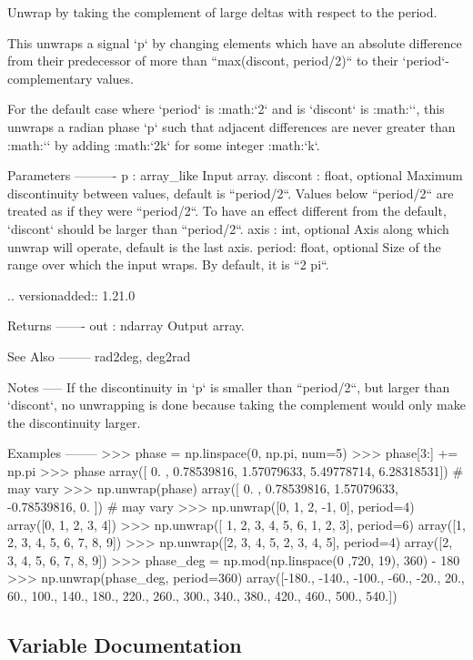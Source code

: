 \begin{DoxyVerb}Unwrap by taking the complement of large deltas with respect to the period.

This unwraps a signal `p` by changing elements which have an absolute
difference from their predecessor of more than ``max(discont, period/2)``
to their `period`-complementary values.

For the default case where `period` is :math:`2\pi` and is `discont` is
:math:`\pi`, this unwraps a radian phase `p` such that adjacent differences
are never greater than :math:`\pi` by adding :math:`2k\pi` for some
integer :math:`k`.

Parameters
----------
p : array_like
    Input array.
discont : float, optional
    Maximum discontinuity between values, default is ``period/2``. 
    Values below ``period/2`` are treated as if they were ``period/2``.
    To have an effect different from the default, `discont` should be
    larger than ``period/2``.
axis : int, optional
    Axis along which unwrap will operate, default is the last axis.
period: float, optional
    Size of the range over which the input wraps. By default, it is
    ``2 pi``.
    
    .. versionadded:: 1.21.0

Returns
-------
out : ndarray
    Output array.

See Also
--------
rad2deg, deg2rad

Notes
-----
If the discontinuity in `p` is smaller than ``period/2``, 
but larger than `discont`, no unwrapping is done because taking 
the complement would only make the discontinuity larger.

Examples
--------
>>> phase = np.linspace(0, np.pi, num=5)
>>> phase[3:] += np.pi
>>> phase
array([ 0.        ,  0.78539816,  1.57079633,  5.49778714,  6.28318531]) # may vary
>>> np.unwrap(phase)
array([ 0.        ,  0.78539816,  1.57079633, -0.78539816,  0.        ]) # may vary
>>> np.unwrap([0, 1, 2, -1, 0], period=4)
array([0, 1, 2, 3, 4])
>>> np.unwrap([ 1, 2, 3, 4, 5, 6, 1, 2, 3], period=6)
array([1, 2, 3, 4, 5, 6, 7, 8, 9])
>>> np.unwrap([2, 3, 4, 5, 2, 3, 4, 5], period=4)
array([2, 3, 4, 5, 6, 7, 8, 9])
>>> phase_deg = np.mod(np.linspace(0 ,720, 19), 360) - 180
>>> np.unwrap(phase_deg, period=360)
array([-180., -140., -100.,  -60.,  -20.,   20.,   60.,  100.,  140.,
        180.,  220.,  260.,  300.,  340.,  380.,  420.,  460.,  500.,
        540.])
\end{DoxyVerb}
 

\subsection{Variable Documentation}
\mbox{\label{namespacenumpy_1_1lib_1_1function__base_ad03f4b858ee9cb78b9adf3cbb4465b1d}} 
